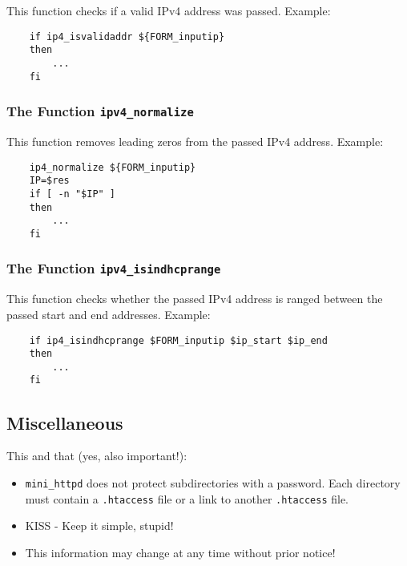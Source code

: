 This function checks if a valid IPv4 address was passed. Example:

\begin{example}
\begin{verbatim}
    if ip4_isvalidaddr ${FORM_inputip}
    then
        ...
    fi
\end{verbatim}
\end{example}

\subsubsection{The Function \texttt{ipv4\_normalize}}

This function removes leading zeros from the passed IPv4 address. Example:

\begin{example}
\begin{verbatim}
    ip4_normalize ${FORM_inputip}
    IP=$res
    if [ -n "$IP" ]
    then
        ...
    fi
\end{verbatim}
\end{example}
\subsubsection{The Function \texttt{ipv4\_isindhcprange}}

This function checks whether the passed IPv4 address is ranged between the
passed start and end addresses. Example:

\begin{example}
\begin{verbatim}
    if ip4_isindhcprange $FORM_inputip $ip_start $ip_end
    then
        ...
    fi
\end{verbatim}
\end{example}

\subsection{Miscellaneous}

This and that (yes, also important!):

\begin{itemize}
 \item \texttt{mini\_httpd} does not protect subdirectories with a password. Each directory
       must contain a \texttt{.htaccess} file or a link to another \texttt{.htaccess} file.
 \item KISS - Keep it simple, stupid!
 \item This information may change at any time without prior notice!
\end{itemize}

